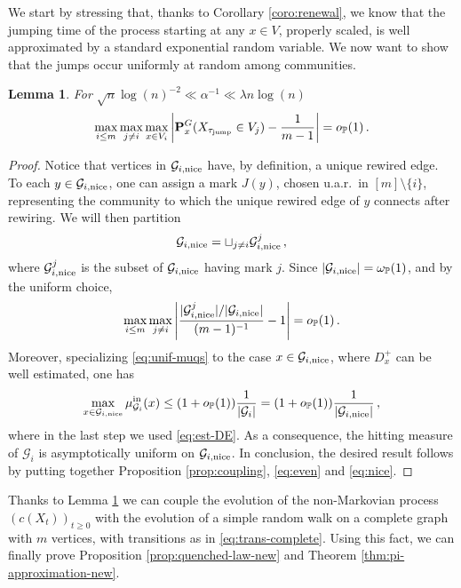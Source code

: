 \documentclass[11pt,oneside]{amsart}
\numberwithin{equation}{section}  %
\theoremstyle{plain}
\newtheorem{lemma}[theorem]{Lemma}
\newcommand{\p}{\mathbb{P}}
\newcommand{\op}{o_{\p}}
\newcommand{\quench}{\mathbf{P}}
\newcommand{\gates}{\mathcal{G}}
\newcommand{\tauj}{\tau_{\textup{jump}}}
\newcommand{\muinb}{\mu^{\rm in}_{\gates_i}}
\begin{document}
	We start by stressing that, thanks to Corollary \ref{coro:renewal}, we know that the jumping time of the process starting at any $x\in V$, properly scaled, is well approximated by a standard exponential random variable. We now want to show that the jumps occur uniformly at random among communities. 
\begin{lemma}\label{lemma:unif-jumps} 	 For $\sqrt{n}\log(n)^{-2}\ll \alpha^{-1}\ll \lambda n \log(n)$ 
	\begin{equation}
		\max_{i \le m}\max_{j\neq i}\max_{x\in V_i}\left|\quench^G_x(X_{\tauj}\in V_j)- \frac1{m-1}\right|=\op (1)\,.
	\end{equation}
\end{lemma}
\begin{proof}
	Notice that vertices in $\gates_{i,\rm nice}$ have, by definition, a unique rewired edge.
To each $y \in \gates_{i,\rm nice}$, one can assign a mark $J(y)$, chosen
u.a.r.~in $[m]\setminus\{i\}$, representing the community to which the unique rewired edge of $y$ connects after rewiring.
    We will then partition
	\begin{equation}
		\gates_{i,\rm nice}=\sqcup_{j\neq i}\gates_{i,\rm nice}^j\,,
	\end{equation}
	where $\gates_{i,\rm nice}^j$ is the subset of $\gates_{i,\rm nice}$ having mark $j$.
	Since $|\gates_{i,\rm nice}|=\omega_{\p}(1)$, and by the uniform choice,
	\begin{equation}\label{eq:even}
		\max_{i \le m}\max_{j\neq i}\left|\frac{|\gates_{i,\rm nice}^j|/|\gates_{i,\rm nice}|}{(m-1)^{-1}} -1\right|=\op(1)\,.
	\end{equation}
	Moreover, specializing \eqref{eq:unif-muqs} to the case $x\in\gates_{i,\rm nice}$, where $D_x^+$ can be well estimated, one has
	\begin{equation}\label{eq:nice}
		\max_{x\in\gates_{i,\rm nice}}\muinb(x)\le (1+\op(1))\frac{1}{|\gates_i|}=(1+\op(1))\frac{1}{|\gates_{i,\rm nice}|}\,,
	\end{equation}
	where in the last step we used \eqref{eq:est-DE}. 
    As a consequence, the hitting measure of $\gates_i$ is asymptotically uniform on $\gates_{i,\rm nice}$. In conclusion, the desired result follows by putting together Proposition \ref{prop:coupling}, \eqref{eq:even} and \eqref{eq:nice}.
\end{proof}
Thanks to Lemma \ref{lemma:unif-jumps} we can couple the evolution of the non-Markovian process $(c(X_t))_{t\ge 0}$ with the evolution of a simple random walk on a complete graph with $m$ vertices, with transitions as in \eqref{eq:trans-complete}. Using this fact,
we can finally prove Proposition \ref{prop:quenched-law-new} and Theorem \ref{thm:pi-approximation-new}.
\end{document}
